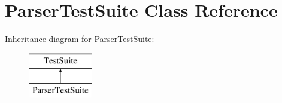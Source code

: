 \hypertarget{class_parser_test_suite}{}\section{Parser\+Test\+Suite Class Reference}
\label{class_parser_test_suite}
Inheritance diagram for Parser\+Test\+Suite\+:\begin{figure}[H]
\begin{center}
\leavevmode
\includegraphics[height=2.000000cm]{class_parser_test_suite}
\end{center}
\end{figure}
